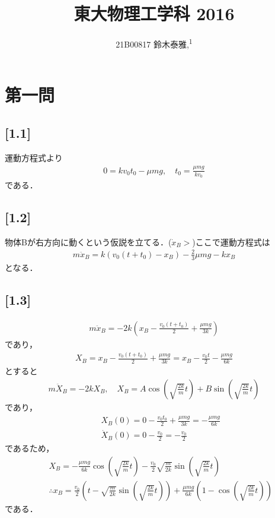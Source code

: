 \documentclass[12pt,dvipdfmx]{jsarticle}
\newcommand\authormark[1]{\textsuperscript{#1}}
\begin{document}
\title{東大物理工学科 2016}

\author{21B00817 鈴木泰雅,\authormark{1}}
\section*{\Large{第一問}}
\subsection*{\large{[1.1]}}
運動方程式より
\begin{eqnarray}
  0 = kv_0t_0 -\mu mg, \quad t_0 = \frac{\mu mg}{kv_0}
\end{eqnarray}
である．
\subsection*{\large{[1.2]}}
物体Bが右方向に動くという仮説を立てる．($\dot{x}_B>$)ここで運動方程式は
\begin{eqnarray}
  m\ddot{x}_B = k(v_0(t+t_0)-x_B)-\frac{2}{3}\mu mg -k x_B
\end{eqnarray}
となる．
\subsection*{\large{[1.3]}}
\begin{eqnarray}
  m\ddot{x}_B = -2k \left( x_B -\frac{v_0 (t+t_0)}{2}+ \frac{\mu mg}{3k} \right)
\end{eqnarray}
であり，
\begin{eqnarray}
  X_B =  x_B -\frac{v_0 (t+t_0)}{2}+ \frac{\mu mg}{3k} = x_B -\frac{v_0 t}{2} -\frac{\mu mg}{6k}
\end{eqnarray}
とすると
\begin{eqnarray}
  m\ddot{X}_B = -2k X_B,\quad X_B = A\cos\left( \sqrt{\frac{2k}{m}}t \right) + B\sin\left( \sqrt{\frac{2k}{m}}t \right)
\end{eqnarray}
であり，
\begin{eqnarray}
  &&X_B(0)= 0 - \frac{v_0 t_0}{2} + \frac{\mu mg}{3k}= -\frac{\mu mg}{6k}\\
  &&\dot{X}_B(0) = 0 -\frac{v_0}{2} = -\frac{v_0}{2}
\end{eqnarray}
であるため，
\begin{eqnarray}
  &&X_B = -\frac{\mu mg}{6k}\cos\left( \sqrt{\frac{2k}{m}}t \right) -\frac{v_0}{2}\sqrt{\frac{m}{2k}}\sin\left( \sqrt{\frac{2k}{m}}t \right)\\
  &&\therefore x_B = \frac{v_0}{2}\left( t-\sqrt{\frac{m}{2k}}\sin\left( \sqrt{\frac{2k}{m}}t \right) \right) + \frac{\mu mg}{6k}\left( 1- \cos\left( \sqrt{\frac{2k}{m}}t \right)\right)
\end{eqnarray}
である．
\end{document}
